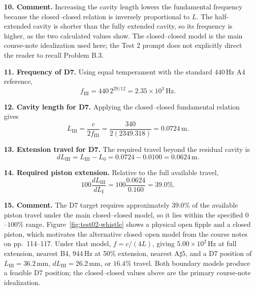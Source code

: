 \textbf{10. Comment.} Increasing the cavity length lowers the fundamental frequency because the closed--closed relation is inversely proportional to \(L\). The half-extended cavity is shorter than the fully extended cavity, so its frequency is higher, as the two calculated values show. The closed--closed model is the main course-note idealization used here; the Test 2 prompt does not explicitly direct the reader to recall Problem B.3.

\textbf{11. Frequency of D7.} Using equal temperament with the standard \(440\,\mathrm{Hz}\) A4 reference,
\[
\boxed{f_{\mathrm{III}}=440\,2^{29/12}=2.35\times10^{3}\,\mathrm{Hz}.}
\]

\textbf{12. Cavity length for D7.} Applying the closed--closed fundamental relation gives
\[
\boxed{L_{\mathrm{III}}=\frac{c}{2f_{\mathrm{III}}}
=\frac{340}{2(2349.318)}=0.0724\,\mathrm{m}.}
\]

\textbf{13. Extension travel for D7.} The required travel beyond the residual cavity is
\[
\boxed{dL_{\mathrm{III}}=L_{\mathrm{III}}-L_{0}=0.0724-0.0100=0.0624\,\mathrm{m}.}
\]

\textbf{14. Required piston extension.} Relative to the full available travel,
\[
\boxed{100\frac{dL_{\mathrm{III}}}{dL_{\mathrm{I}}}
=100\frac{0.0624}{0.160}=39.0\%.}
\]

\textbf{15. Comment.} The D7 target requires approximately \(39.0\%\) of the available piston travel under the main closed--closed model, so it lies within the specified \(0\)--\(100\%\) range. Figure~\ref{fig:test02-whistle} shows a physical open fipple and a closed piston, which motivates the alternative closed--open model from the course notes on pp.~114--117. Under that model, \(f=c/(4L)\), giving \(5.00\times10^{2}\,\mathrm{Hz}\) at full extension, nearest B4, \(944\,\mathrm{Hz}\) at 50\% extension, nearest \(\mathrm{A\sharp5}\), and a D7 position of \(L_{\mathrm{III}}=36.2\,\mathrm{mm}\), \(dL_{\mathrm{III}}=26.2\,\mathrm{mm}\), or \(16.4\%\) travel. Both boundary models produce a feasible D7 position; the closed--closed values above are the primary course-note idealization.

\clearpage
{}

